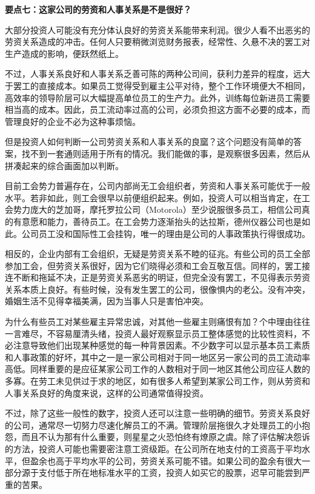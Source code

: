 \documentclass[UTF8,a4paper,zihao=-4,fontset = windows]{ctexart} %
\begin{document}
\textbf{要点七：这家公司的劳资和人事关系是不是很好？}


大部分投资人可能没有充分体认良好的劳资关系能带来利润。很少人看不出恶劣的劳资关系造成的冲击。任何人只要稍微浏览财务报表，经常性、久悬不决的罢工对生产造成的影响，便跃然纸上。

不过，人事关系良好和人事关系乏善可陈的两种公司间，获利力差异的程度，远大于罢工的直接成本。如果员工觉得受到雇主公平对待，整个工作环境便大不相同，高效率的领导阶层可以大幅提高单位员工的生产力。此外，训练每位新进员工需要相当高的成本。因此，员工流动率过高的公司，必须负担这方面不必要的成本，而管理良好的企业不必为这种事烦恼。

但是投资人如何判断一公司劳资关系和人事关系的良窳？这个问题没有简单的答案，找不到一套通则适用于所有的情况。我们能做的事，是观察很多因素，然后从拼凑起来的综合画面加以判断。

目前工会势力普遍存在，公司内部尚无工会组织者，劳资和人事关系可能优于一般水平。若非如此，则工会很早以前便组织起来。例如，投资人可以相当肯定，在工会势力庞大的芝加哥，摩托罗拉公司（Motorola）至少说服很多员工，相信公司真的有意愿和能力，善待员工。在工会势力逐渐抬头的达拉斯，德州仪器公司也是如此。公司员工没和国际性工会挂钩，唯一的理由是公司的人事政策执行得很成功。

相反的，企业内部有工会组织，无疑是劳资关系不睦的征兆。有些公司的员工全部参加工会，但劳资关系很好，因为它们晓得必须和工会互敬互信。同样的，罢工接连不断和拖延不决，正是劳资关系恶劣的明证，但完全没有罢工，不见得表示劳资关系本质上良好。有些时候，没有发生罢工的公司，很像惧内的老公。没有冲突，婚姻生活不见得幸福美满，因为当事人只是害怕冲突。

为什么有些员工对某些雇主异常忠诚，对其他一些雇主则痛恨有加？个中理由往往一言难尽，不容易厘清头绪，投资人最好观察显示员工整体感觉的比较性资料，不必注意导致他们出现某种感觉的每一种背景因素。不少数字可以显示基本员工素质和人事政策的好坏，其中之一是一家公司相对于同一地区另一家公司的员工流动率高低。同样重要的是应征某家公司工作的人数相对于同一地区其他公司应征人数的多寡。在劳工未见供过于求的地区，如有很多人希望到某家公司工作，则从劳资和人事关系良好的角度来说，这样的公司通常值得投资。

不过，除了这些一般性的数字，投资人还可以注意一些明确的细节。劳资关系良好的公司，通常尽一切努力尽速化解员工的不满。管理阶层拖很久才处理员工的小抱怨，而且不认为那有什么重要，则星星之火恐怕终有燎原之虞。除了评估解决怨诉的方法，投资人可能也需要密注意工资级距。在公司所在地支付的工资高于平均水平，但盈余也高于平均水平的公司，劳资关系可能不错。如果公司的盈余有很大一部分源于支付低于所在地标准水平的工资，投资人如买它的股票，迟早可能尝到严重的苦果。
\end{document}
